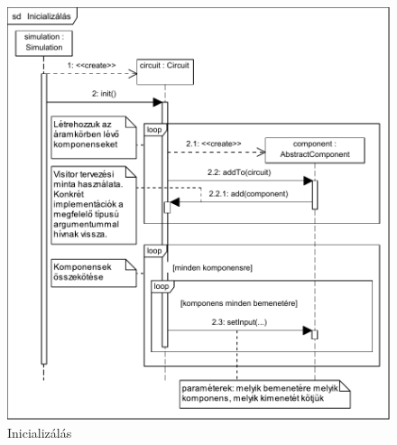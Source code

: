 \begin{figure}[H]
\begin{center}
\includegraphics{chapters/chapter04/seqdiagrams/new/init.pdf}
\caption{Inicializálás}
\label{fig:init}
\end{center}
\end{figure}

